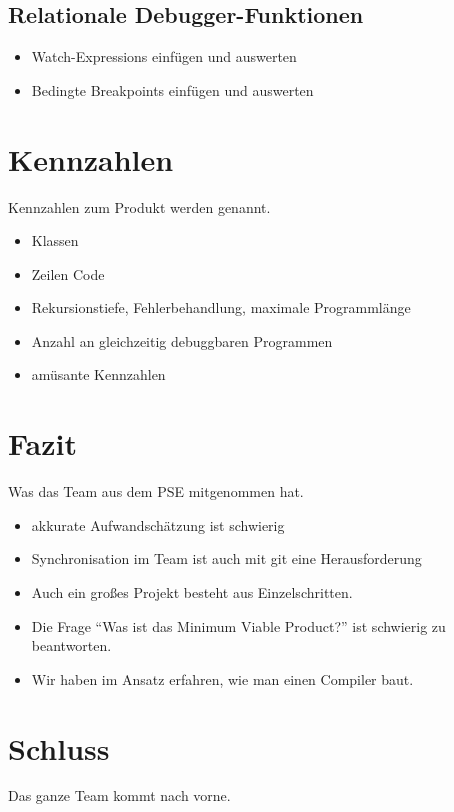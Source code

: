\documentclass[parskip=full]{scrartcl}
\begin{document}
\subsection{Relationale Debugger-Funktionen}
\begin{itemize}
\item Watch-Expressions einfügen und auswerten
\item Bedingte Breakpoints einfügen und auswerten
\end{itemize}

\section{Kennzahlen}
Kennzahlen zum Produkt werden genannt.
\begin{itemize}
\item Klassen
\item Zeilen Code
\item Rekursionstiefe, Fehlerbehandlung, maximale Programmlänge
\item Anzahl an gleichzeitig debuggbaren Programmen
\item amüsante Kennzahlen
\end{itemize}

\section{Fazit}
Was das Team aus dem PSE mitgenommen hat.

\begin{itemize}
\item akkurate Aufwandschätzung ist schwierig
\item Synchronisation im Team ist auch mit git eine Herausforderung
\item Auch ein großes Projekt besteht aus Einzelschritten.
\item Die Frage \enquote{Was ist das Minimum Viable Product?} ist schwierig zu beantworten.
\item Wir haben im Ansatz erfahren, wie man einen Compiler baut.
\end{itemize}

\section{Schluss}
Das ganze Team kommt nach vorne.
\end{document}
